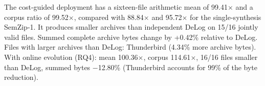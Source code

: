 The cost-guided deployment has a sixteen-file arithmetic mean of 99.41$\times$ and a corpus ratio of 99.52$\times$, compared with 88.84$\times$ and 95.72$\times$ for the single-synthesis SemZip-1.
It produces smaller archives than independent DeLog on 15/16 jointly valid files.
Summed complete archive bytes change by +0.42\% relative to DeLog.
Files with larger archives than DeLog: Thunderbird (4.34\% more archive bytes).
With online evolution (RQ4): mean 100.36$\times$, corpus 114.61$\times$, 16/16 files smaller than DeLog, summed bytes $-$12.80\% (Thunderbird accounts for 99\% of the byte reduction).
